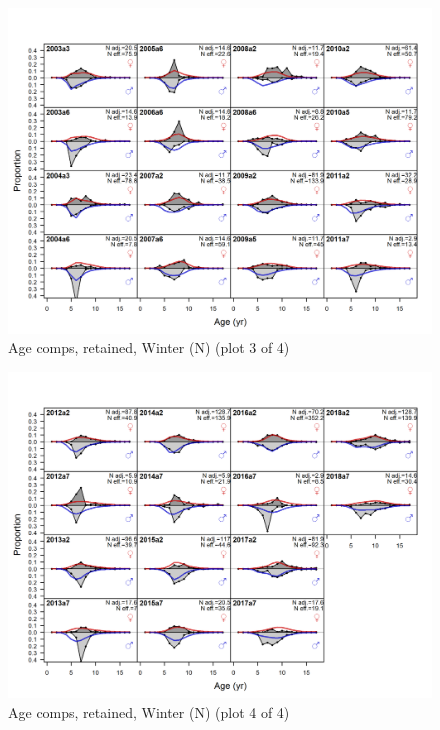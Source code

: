 \documentclass[12pt,]{article}
\begin{document}
\begin{figure}
\centering
\includegraphics{r4ss/plots_mod1/comp_agefit_flt1mkt2_page3.png}
\caption{Age comps, retained, Winter (N) (plot 3 of 4)
\label{fig:age_fits}}
\end{figure}

\begin{figure}
\centering
\includegraphics{r4ss/plots_mod1/comp_agefit_flt1mkt2_page4.png}
\caption{Age comps, retained, Winter (N) (plot 4 of 4)
\label{fig:age_fits}}
\end{figure}
\end{document}
